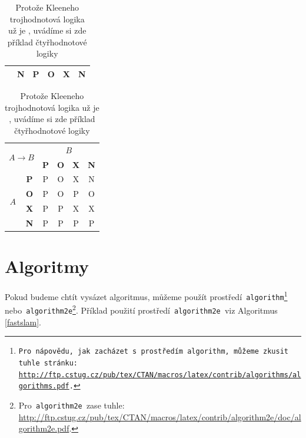 \documentclass[a4paper, 11pt]{article}
\begin{document}
\begin{table}[ht]
\begin{center}
\begin{tabular}{|c|c|c|c|c|c|}
            \cline{2-6}
                                   & \textbf{N} & P          & O          & X          & N \\
            \hline
        \end{tabular}
        \begin{tabular}{|c|c|c|c|c|c|}
            \hline
            \multicolumn{2}{|c|}{\multirow{2}{*}{$A \rightarrow B$}} & \multicolumn{4}{c|}{$B$} \\
            \cline{3-6}
            \multicolumn{2}{|c|}{} & \textbf{P} & \textbf{O} & \textbf{X} & \textbf{N}          \\
            \hline
            \multirow{4}{*}{$A$}   & \textbf{P} & P          & O          & X          & N      \\
            \cline{2-6}
                                   & \textbf{O} & P          & O          & P          & O      \\
            \cline{2-6}
                                   & \textbf{X} & P          & P          & X          & X      \\
            \cline{2-6}
                                   & \textbf{N} & P          & P          & P          & P      \\
            \hline
        \end{tabular}
        \caption{Protože Kleeneho trojhodnotová logika už je , uvádíme si zde příklad čtyřhodnotové logiky}
        \label{pravdivostni_tabulka}
    \end{center}
\end{table}
\pagebreak
\section{Algoritmy}
\label{algoritmy}
Pokud budeme chtít vysázet algoritmus, můžeme použít prostředí\texttt{ algorithm\footnote{Pro nápovědu, jak zacházet s prostředím\texttt{ algorithm,} můžeme zkusit tuhle stránku:\\
\href{http://ftp.cstug.cz/pub/tex/CTAN/macros/latex/contrib/algorithms/algorithms.pdf}{http://ftp.cstug.cz/pub/tex/CTAN/macros/latex/contrib/algorithms/algorithms.pdf}.} }
nebo\texttt{ algorithm2e}\footnote{Pro\texttt{ algorithm2e }zase tuhle: \href{http://ftp.cstug.cz/pub/tex/CTAN/macros/latex/contrib/algorithm2e/doc/algorithm2e.pdf}{http://ftp.cstug.cz/pub/tex/CTAN/macros/latex/contrib/algorithm2e/doc/algorithm2e.pdf}.}. Příklad použití prostředí\texttt{ algorithm2e }viz Algoritmus \ref{fastslam}. \\
\end{document}
